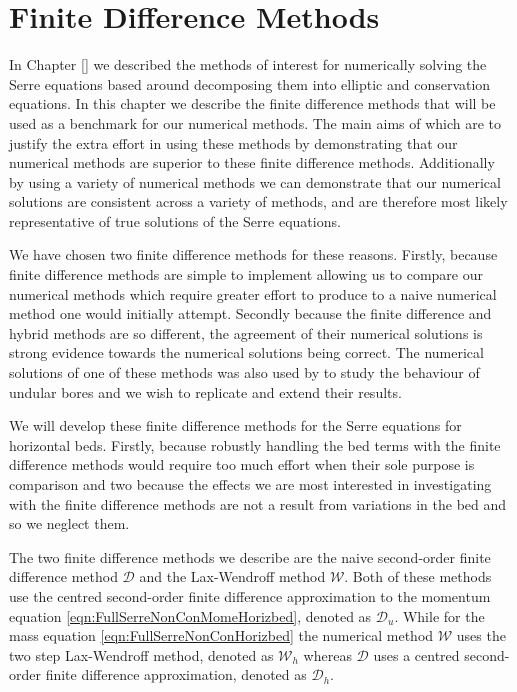 
\chapter{Finite Difference Methods}
\label{chp:NumMethod}
In Chapter [] we described the methods of interest for numerically solving the Serre equations based around decomposing them into elliptic and conservation equations. In this chapter we describe the finite difference methods that will be used as a benchmark for our numerical methods. The main aims of which are to justify the extra effort in using these methods by demonstrating that our numerical methods are superior to these finite difference methods. Additionally by using a variety of numerical methods we can demonstrate that our numerical solutions are consistent across a variety of methods, and are therefore most likely representative of true solutions of the Serre equations. 

We have chosen two finite difference methods for these reasons. Firstly, because finite difference methods are simple to implement allowing us to compare our numerical methods which require greater effort to produce to a naive numerical method one would initially attempt. Secondly because the finite difference and hybrid methods are so different, the agreement of their numerical solutions is strong evidence towards the numerical solutions being correct. The numerical solutions of one of these methods was also used by \cite{El-etal-2006} to study the behaviour of undular bores and we wish to replicate and extend their results.

We will develop these finite difference methods for the Serre equations for horizontal beds. Firstly, because robustly handling the bed terms with the finite difference methods would require too much effort when their sole purpose is comparison and two because the effects we are most interested in investigating with the finite difference methods are not a result from variations in the bed and so we neglect them.

The two finite difference methods we describe are the naive second-order finite difference method $\mathcal{D}$ and the Lax-Wendroff method $\mathcal{W}$. Both of these methods use the centred second-order finite difference approximation to the momentum equation \eqref{eqn:FullSerreNonConMomeHorizbed}, denoted as $\mathcal{D}_u$. While for the mass equation \eqref{eqn:FullSerreNonConHorizbed} the numerical method $\mathcal{W}$ uses the two step Lax-Wendroff method, denoted as $\mathcal{W}_h$ whereas $\mathcal{D}$ uses a centred second-order finite difference approximation, denoted as $\mathcal{D}_h$. 

